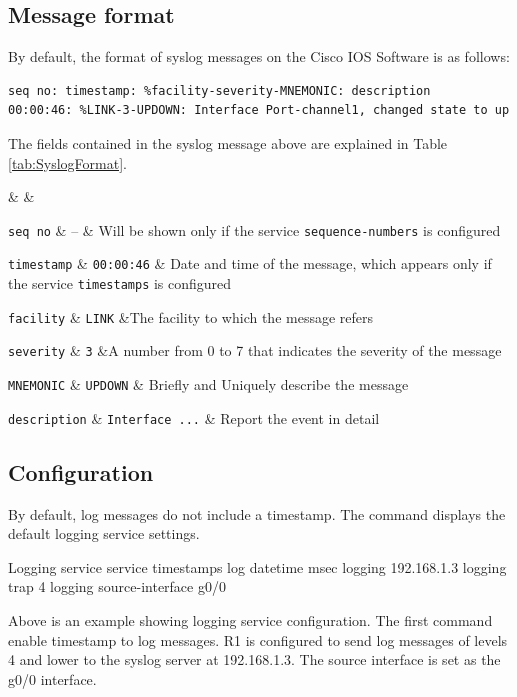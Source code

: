 \subsection{Message format}

By default, the format of syslog messages on the Cisco IOS Software is as follows:

\begin{verbatim}
seq no: timestamp: %facility-severity-MNEMONIC: description
00:00:46: %LINK-3-UPDOWN: Interface Port-channel1, changed state to up
\end{verbatim}

The fields contained in the syslog message above are explained in Table \ref{tab:SyslogFormat}.

 &  &\w

\verb|seq no| & -- & Will be shown only if the service \verb|sequence-numbers| is configured \w

\verb|timestamp| & \verb|00:00:46| & Date and time of the message, which appears only if the service \verb|timestamps| is configured \w

\verb|facility| & \verb|LINK| &The facility to which the message refers \w

\verb|severity| &  \verb|3| &A number from 0 to 7  that indicates the severity of the message \w

\verb|MNEMONIC| & \verb|UPDOWN| & Briefly and Uniquely describe the message\w

\verb|description| & \verb|Interface ...| & Report the event in detail\w
\tableEnd

\subsection{Configuration}

By default, log messages do not include a timestamp. The  command displays the default logging service settings.\\

\begin{sexylisting}{Logging service}
service timestamps log datetime msec
logging 192.168.1.3
logging trap 4
logging source-interface g0/0
\end{sexylisting}

Above is an example showing logging service configuration. The first command enable timestamp to log messages. R1 is configured to send log messages of levels 4 and lower to the syslog server at 192.168.1.3. The source interface is set as the g0/0 interface.

